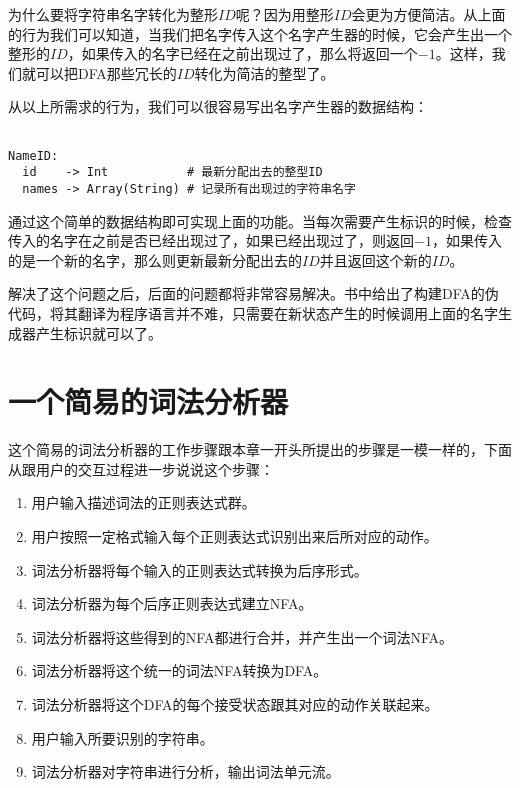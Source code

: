 为什么要将字符串名字转化为整形$ID$呢？因为用整形$ID$会更为方便简洁。从上面的行为我们可以知道，当我们把名字传入这个名字产生器的时候，它会产生出一个整形的$ID$，如果传入的名字已经在之前出现过了，那么将返回一个$-1$。这样，我们就可以把DFA那些冗长的$ID$转化为简洁的整型了。

从以上所需求的行为，我们可以很容易写出名字产生器的数据结构：

\begin{verbatim}

NameID:
  id    -> Int           # 最新分配出去的整型ID
  names -> Array(String) # 记录所有出现过的字符串名字

\end{verbatim}
                  
通过这个简单的数据结构即可实现上面的功能。当每次需要产生标识的时候，检查传入的名字在之前是否已经出现过了，如果已经出现过了，则返回$-1$，如果传入的是一个新的名字，那么则更新最新分配出去的$ID$并且返回这个新的$ID$。

解决了这个问题之后，后面的问题都将非常容易解决。书中给出了构建DFA的伪代码，将其翻译为程序语言并不难，只需要在新状态产生的时候调用上面的名字生成器产生标识就可以了。

\section{一个简易的词法分析器}

这个简易的词法分析器的工作步骤跟本章一开头所提出的步骤是一模一样的，下面从跟用户的交互过程进一步说说这个步骤：

\begin{enumerate}
    \item 用户输入描述词法的正则表达式群。
    \item 用户按照一定格式输入每个正则表达式识别出来后所对应的动作。
    \item 词法分析器将每个输入的正则表达式转换为后序形式。
    \item 词法分析器为每个后序正则表达式建立NFA。
    \item 词法分析器将这些得到的NFA都进行合并，并产生出一个词法NFA。
    \item 词法分析器将这个统一的词法NFA转换为DFA。
    \item 词法分析器将这个DFA的每个接受状态跟其对应的动作关联起来。
    \item 用户输入所要识别的字符串。
    \item 词法分析器对字符串进行分析，输出词法单元流。
\end{enumerate}

